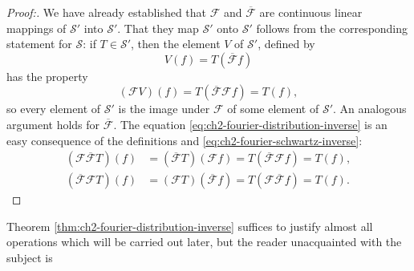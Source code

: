 \begin{proof}[Proof:]
We have already established that $\mathcal{F}$ and
$\overline{\mathcal{F}}$ are continuous linear mappings of $\mathcal{S}'$
into $\mathcal{S}'$.  That they map $\mathcal{S}'$ onto $\mathcal{S}'$
follows from the corresponding statement for $\mathcal{S}$: if $T\in
\mathcal{S}'$, then the element $V$ of $\mathcal{S}'$, defined by
\begin{equation*}
  V(f)=T(\overline{\mathcal{F}}f)
\end{equation*}
has the property
\begin{equation*}
  (\mathcal{F}V)(f)=T(\overline{\mathcal{F}}\mathcal{F}f)=T(f),
\end{equation*}
so every element of $\mathcal{S}'$ is the image under $\mathcal{F}$ of some
element of $\mathcal{S}'$.  An analogous argument holds for
$\overline{\mathcal{F}}$.  The equation \eqref{eq:ch2-fourier-distribution-inverse} is an easy consequence of the
definitions and \eqref{eq:ch2-fourier-schwartz-inverse}:
\begin{equation*}
\begin{aligned}
  (\mathcal{F}\overline{\mathcal{F}}T)(f)
  &= (\overline{\mathcal{F}}T)(\mathcal{F}f)
   = T(\overline{\mathcal{F}}\mathcal{F}f)=T(f), \\
  (\overline{\mathcal{F}}\mathcal{F}T)(f)
  &= (\mathcal{F}T)(\overline{\mathcal{F}}f)
   = T(\mathcal{F}\overline{\mathcal{F}}f)=T(f).
\end{aligned}
\end{equation*}
\end{proof}

Theorem \ref{thm:ch2-fourier-distribution-inverse} suffices to justify almost all operations which will be carried
out later, but the reader unacquainted with the subject is
